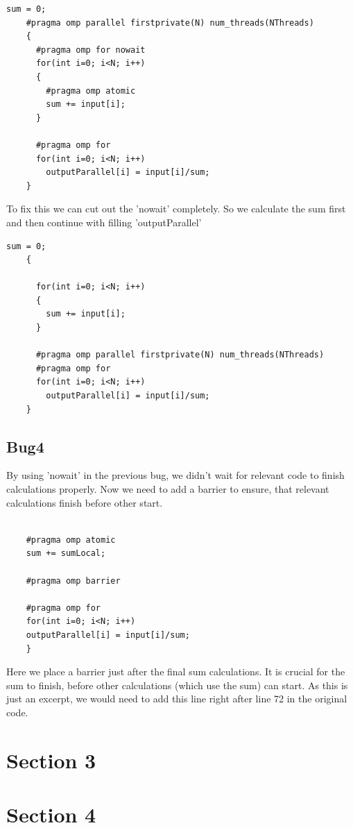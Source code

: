 \documentclass{article}
\begin{document}
\begin{lstlisting}[caption=Step 2]
    sum = 0;
    #pragma omp parallel firstprivate(N) num_threads(NThreads)
    {
      #pragma omp for nowait
      for(int i=0; i<N; i++)
      {
        #pragma omp atomic
        sum += input[i];
      }
  
      #pragma omp for 
      for(int i=0; i<N; i++)
        outputParallel[i] = input[i]/sum;
    }
\end{lstlisting}
To fix this we can cut out the 'nowait' completely.
So we calculate the sum first and then continue with filling 'outputParallel'
\begin{lstlisting}[caption=Step 2]
    sum = 0;
    {
  
      for(int i=0; i<N; i++)
      {
        sum += input[i];
      }
      
      #pragma omp parallel firstprivate(N) num_threads(NThreads)
      #pragma omp for 
      for(int i=0; i<N; i++)
        outputParallel[i] = input[i]/sum;
    }
\end{lstlisting}
\subsection*{Bug4}
By using 'nowait' in the previous bug, we didn't wait for relevant code to finish calculations properly.
Now we need to add a barrier to ensure, that relevant calculations finish before other start.
\begin{lstlisting}[caption=Step 2]

    #pragma omp atomic
    sum += sumLocal;
    
    #pragma omp barrier
    
    #pragma omp for
    for(int i=0; i<N; i++)
    outputParallel[i] = input[i]/sum;
    }
\end{lstlisting}
Here we place a barrier just after the final sum calculations.
It is crucial for the sum to finish, before other calculations (which use the sum) can start.
As this is just an excerpt, we would need to add this line right after line 72 in the original code.

\section*{Section 3}
\section*{Section 4}


  
\end{document}
